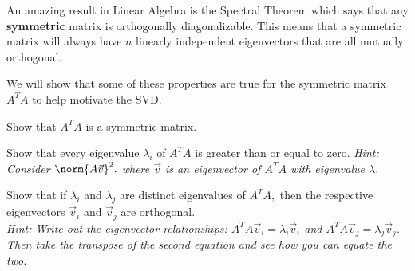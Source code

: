 


An amazing result in Linear Algebra is the Spectral Theorem which says that any \textbf{symmetric} matrix is orthogonally diagonalizable. 
This means that a symmetric matrix will always have $n$ linearly independent eigenvectors that are all mutually orthogonal.

We will show that some of these properties are true for the symmetric matrix $A^{T} A$ to help motivate the SVD.

\begin{enumerate}
  \qitem Show that $A^{T}A$ is a symmetric matrix.


  \qitem Show that every eigenvalue $\lambda_{i}$ of $A^{T}A$ is greater than or equal to zero. \vskip 1pt 
  \textit{Hint: Consider $\norm{A\vec{v}}^{2}.$ where $\vec{v}$ is an eigenvector of $A^{T}A$ with eigenvalue $\lambda.$}


  \qitem Show that if $\lambda_{i}$ and $\lambda_{j}$ are distinct eigenvalues of $A^{T} A,$ then the respective eigenvectors $\vec{v}_{i}$ and $\vec{v}_{j}$ are orthogonal. \\
  \textit{Hint: Write out the eigenvector relationships: $A^{T} A \vec{v}_{i} = \lambda_{i} \vec{v}_{i}$ and $A^{T} A \vec{v}_{j} = \lambda_{j} \vec{v}_{j}.$ Then take the transpose of the second equation and see how you can equate the two.}


\end{enumerate}
